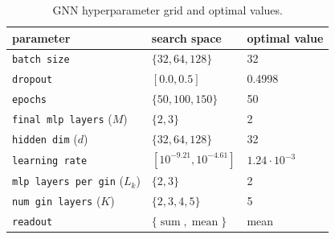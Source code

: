 \begin{table}[h!]
    \centering
    \caption{GNN hyperparameter grid and optimal values.}
    \label{tab: hyperparameter results}
    \begin{tabular}{l l l}
    \toprule
         parameter & search space & optimal value  \\
     \midrule
        \texttt{batch size} & $\{ 32, 64, 128 \}$ & 32 \\
        \texttt{dropout} & $[0.0, 0.5]$ & 0.4998 \\
        \texttt{epochs} & $\{ 50, 100, 150 \}$ & 50 \\
        \texttt{final mlp layers} ($M$) & $\{ 2, 3 \}$ & 2 \\
        \texttt{hidden dim} ($d$) & $\{ 32, 64, 128 \}$ & 32 \\
        \texttt{learning rate} & $[10^{-9.21}, 10^{-4.61}]$ & $1.24 \cdot 10^{-3}$ \\
        \texttt{mlp layers per gin} ($L_k$) & $\{ 2, 3 \}$ & 2 \\
        \texttt{num gin layers} ($K$) & $\{ 2, 3, 4, 5 \}$ & 5 \\
        \texttt{readout} & $\{\operatorname{sum}, \operatorname{mean} \}$ & mean \\
    \bottomrule
    \end{tabular}
\end{table}